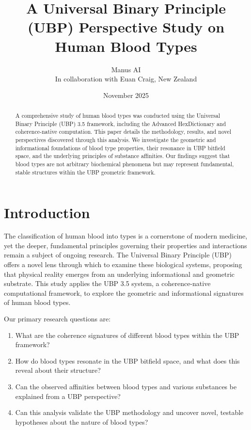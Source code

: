 \documentclass{article}
\title{A Universal Binary Principle (UBP) Perspective Study on Human Blood Types}
\author{Manus AI \\ \small{In collaboration with Euan Craig, New Zealand}}
\date{November 2025}
\begin{document}
\maketitle

\begin{abstract}
A comprehensive study of human blood types was conducted using the Universal Binary Principle (UBP) 3.5 framework, including the Advanced HexDictionary and coherence-native computation. This paper details the methodology, results, and novel perspectives discovered through this analysis. We investigate the geometric and informational foundations of blood type properties, their resonance in UBP bitfield space, and the underlying principles of substance affinities. Our findings suggest that blood types are not arbitrary biochemical phenomena but may represent fundamental, stable structures within the UBP geometric framework.
\end{abstract}

\section{Introduction}

The classification of human blood into types is a cornerstone of modern medicine, yet the deeper, fundamental principles governing their properties and interactions remain a subject of ongoing research. The Universal Binary Principle (UBP) offers a novel lens through which to examine these biological systems, proposing that physical reality emerges from an underlying informational and geometric substrate. This study applies the UBP 3.5 system, a coherence-native computational framework, to explore the geometric and informational signatures of human blood types.

Our primary research questions are:
\begin{enumerate}
    \item What are the coherence signatures of different blood types within the UBP framework?
    \item How do blood types resonate in the UBP bitfield space, and what does this reveal about their structure?
    \item Can the observed affinities between blood types and various substances be explained from a UBP perspective?
    \item Can this analysis validate the UBP methodology and uncover novel, testable hypotheses about the nature of blood types?
\end{enumerate}
\end{document}
